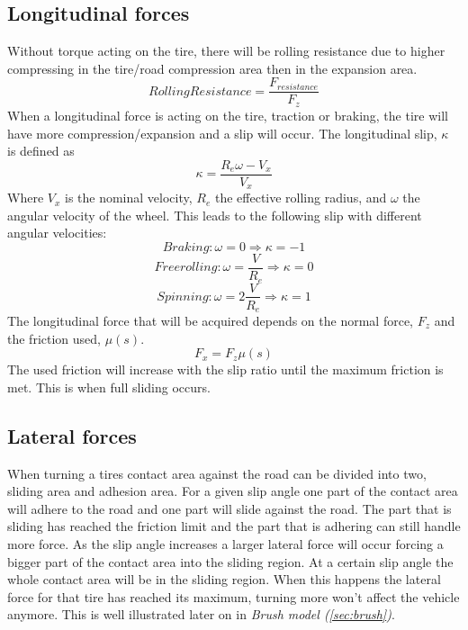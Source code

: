 \subsection{Longitudinal forces}
Without torque acting on the tire, there will be rolling resistance due to higher compressing in the tire/road compression area then in the expansion area.
\begin{equation}
RollingResistance = \frac{F_{resistance}}{F_{z}}
\end{equation}
When a longitudinal force is acting on the tire, traction or braking, the tire will have more compression/expansion and a slip will occur. The longitudinal slip, $ \kappa $ is defined as
\begin{equation}
\kappa = \dfrac{R_{e}\omega-V_{x}}{V_{x}}
\end{equation}
Where $V_{x}$ is the nominal velocity, $R_{e}$ the effective rolling radius, and $\omega$ the angular velocity of the wheel. This leads to the following slip with different angular velocities:
\begin{equation}
Braking: \omega = 0 \Rightarrow \kappa = -1
\end{equation}
\begin{equation}
Free rolling: \omega = \frac{V}{R_{e}} \Rightarrow \kappa = 0
\end{equation}
\begin{equation}
Spinning: \omega = 2\frac{V}{R_{e}} \Rightarrow \kappa = 1
\end{equation}
The longitudinal force that will be acquired depends on the normal force, $ F_{z} $ and the friction used, $ \mu(s) $.
\begin{equation}
F_{x} = F_{z}\mu(s)
\end{equation}
The used friction will increase with the slip ratio until the maximum friction is met. This is when full sliding occurs. 

\subsection{Lateral forces}
When turning a tires contact area against the road can be divided into two, sliding area and adhesion area. For a given slip angle one part of the contact area will adhere to the road and one part will slide against the road. The part that is sliding has reached the friction limit and the part that is adhering can still handle more force. As the slip angle increases a larger lateral force will occur forcing a bigger part of the contact area into the sliding region. At a certain slip angle the whole contact area will be in the sliding region. When this happens the lateral force for that tire has reached its maximum, turning more won't affect the vehicle anymore. This is well illustrated later on in \textit{Brush model (\ref{sec:brush})}.

